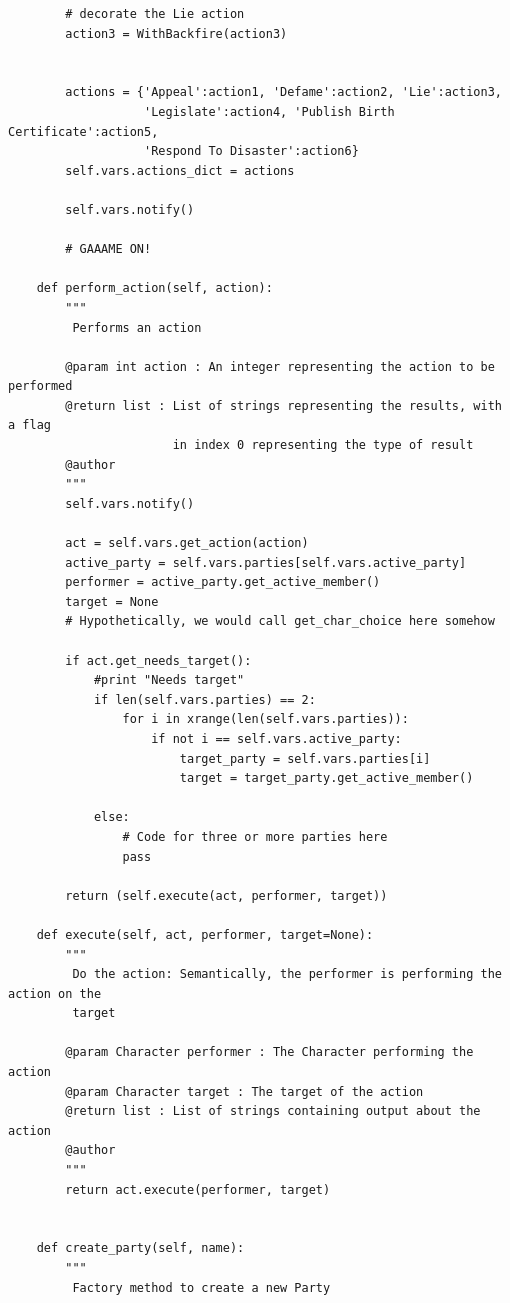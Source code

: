 \documentclass[11pt]{report}
\begin{document}
\begin{verbatim}
        # decorate the Lie action
        action3 = WithBackfire(action3)
        
        
        actions = {'Appeal':action1, 'Defame':action2, 'Lie':action3,
                   'Legislate':action4, 'Publish Birth Certificate':action5,
                   'Respond To Disaster':action6}
        self.vars.actions_dict = actions
        
        self.vars.notify()
        
        # GAAAME ON!

    def perform_action(self, action):
        """
         Performs an action

        @param int action : An integer representing the action to be performed
        @return list : List of strings representing the results, with a flag
                       in index 0 representing the type of result
        @author
        """
        self.vars.notify()
        
        act = self.vars.get_action(action)
        active_party = self.vars.parties[self.vars.active_party]
        performer = active_party.get_active_member()
        target = None
        # Hypothetically, we would call get_char_choice here somehow
        
        if act.get_needs_target():
            #print "Needs target"
            if len(self.vars.parties) == 2:
                for i in xrange(len(self.vars.parties)):
                    if not i == self.vars.active_party:
                        target_party = self.vars.parties[i]
                        target = target_party.get_active_member()
                       
            else:
                # Code for three or more parties here
                pass
            
        return (self.execute(act, performer, target))

    def execute(self, act, performer, target=None):
        """
         Do the action: Semantically, the performer is performing the action on the
         target

        @param Character performer : The Character performing the action
        @param Character target : The target of the action
        @return list : List of strings containing output about the action
        @author
        """
        return act.execute(performer, target)


    def create_party(self, name):
        """
         Factory method to create a new Party


\end{verbatim}
\end{document}
